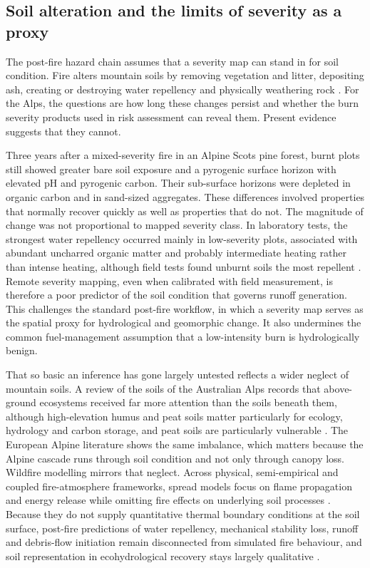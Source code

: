 \documentclass[11pt,a4paper]{article}
\begin{document}
\subsection{Soil alteration and the limits of severity as a proxy}

The post-fire hazard chain assumes that a severity map can stand in for soil condition. Fire alters mountain soils by removing vegetation and litter, depositing ash, creating or destroying water repellency and physically weathering rock \citep{santi_wildfire_2022}. For the Alps, the questions are how long these changes persist and whether the burn severity products used in risk assessment can reveal them. Present evidence suggests that they cannot.

Three years after a mixed-severity fire in an Alpine Scots pine forest, burnt plots still showed greater bare soil exposure and a pyrogenic surface horizon with elevated pH and pyrogenic carbon. Their sub-surface horizons were depleted in organic carbon and in sand-sized aggregates. These differences involved properties that normally recover quickly as well as properties that do not. The magnitude of change was not proportional to mapped severity class. In laboratory tests, the strongest water repellency occurred mainly in low-severity plots, associated with abundant uncharred organic matter and probably intermediate heating rather than intense heating, although field tests found unburnt soils the most repellent \citep{negri_wildfire_2026}. Remote severity mapping, even when calibrated with field measurement, is therefore a poor predictor of the soil condition that governs runoff generation. This challenges the standard post-fire workflow, in which a severity map serves as the spatial proxy for hydrological and geomorphic change. It also undermines the common fuel-management assumption that a low-intensity burn is hydrologically benign.

That so basic an inference has gone largely untested reflects a wider neglect of mountain soils. A review of the soils of the Australian Alps records that above-ground ecosystems received far more attention than the soils beneath them, although high-elevation humus and peat soils matter particularly for ecology, hydrology and carbon storage, and peat soils are particularly vulnerable \citep{wilson_distribution_2022}. The European Alpine literature shows the same imbalance, which matters because the Alpine cascade runs through soil condition and not only through canopy loss. Wildfire modelling mirrors that neglect. Across physical, semi-empirical and coupled fire-atmosphere frameworks, spread models focus on flame propagation and energy release while omitting fire effects on underlying soil processes \citep{or_review_2023}. Because they do not supply quantitative thermal boundary conditions at the soil surface, post-fire predictions of water repellency, mechanical stability loss, runoff and debris-flow initiation remain disconnected from simulated fire behaviour, and soil representation in ecohydrological recovery stays largely qualitative \citep{or_review_2023}.
\end{document}
